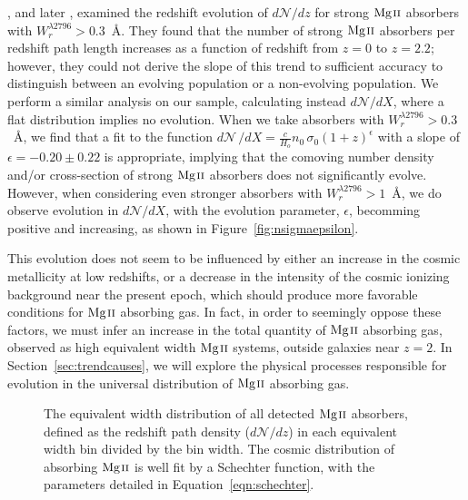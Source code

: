 \documentclass[iop,apj,numberedappendix,appendixfloats,twocolappendix]{emulateapj}
\begin{document}
\cite{Steidel1992}, and later \cite{Nestor2005}, examined the redshift evolution of $d\mathcal{N}\!/dz$ for strong ${\hbox{{\rm Mg}\kern 0.1em{\sc ii}}}$ absorbers with $W_r^{\lambda2796} > 0.3$~{\AA}. They found that the number of strong ${\hbox{{\rm Mg}\kern 0.1em{\sc ii}}}$ absorbers per redshift path length increases as a function of redshift from $z = 0$ to $z = 2.2$; however, they could not derive the slope of this trend to sufficient accuracy to distinguish between an evolving population or a non-evolving population. We perform a similar analysis on our sample, calculating instead $d\mathcal{N}\!/dX$, where a flat distribution implies no evolution. When we take absorbers with $W_r^{\lambda2796} > 0.3$~{\AA}, we find that a fit to the function $d\mathcal{N}\,/dX = \frac{c}{H_o}n_0\,\sigma_0(1+z)^{\epsilon}$ with a slope of $\epsilon = -0.20 \pm 0.22$ is appropriate, implying that the comoving number density and/or cross-section of strong ${\hbox{{\rm Mg}\kern 0.1em{\sc ii}}}$ absorbers does not significantly evolve. However, when considering even stronger absorbers with $W_r^{\lambda2796} > 1$~{\AA}, we do observe evolution in $d\mathcal{N}\!/dX$, with the evolution parameter, $\epsilon$, becomming positive and increasing, as shown in Figure~\ref{fig:nsigmaepsilon}.

This evolution does not seem to be influenced by either an increase in the cosmic metallicity at low redshifts, or a decrease in the intensity of the cosmic ionizing background near the present epoch, which should produce more favorable conditions for ${\hbox{{\rm Mg}\kern 0.1em{\sc ii}}}$ absorbing gas. In fact, in order to seemingly oppose these factors, we must infer an increase in the total quantity of ${\hbox{{\rm Mg}\kern 0.1em{\sc ii}}}$ absorbing gas, observed as high equivalent width ${\hbox{{\rm Mg}\kern 0.1em{\sc ii}}}$ systems, outside galaxies near $z = 2$. In Section~\ref{sec:trendcauses}, we will explore the physical processes responsible for evolution in the universal distribution of ${\hbox{{\rm Mg}\kern 0.1em{\sc ii}}}$ absorbing gas.

\begin{figure}[bth]
\caption{The equivalent width distribution of all detected ${\hbox{{\rm Mg}\kern 0.1em{\sc ii}}}$ absorbers, defined as the redshift path density ($d\mathcal{N}\!/dz$) in each equivalent width bin divided by the bin width. The cosmic distribution of absorbing ${\hbox{{\rm Mg}\kern 0.1em{\sc ii}}}$ is well fit by a Schechter function, with the parameters detailed in Equation~\ref{eqn:schechter}.}
\label{fig:totalewdistro}
\end{figure}
\end{document}
